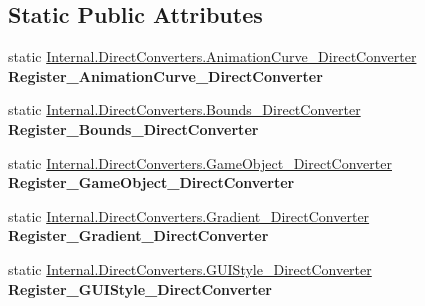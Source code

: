 \subsection*{Static Public Attributes}
\begin{DoxyCompactItemize}
\item 
\mbox{\label{class_full_serializer_1_1fs_converter_registrar_a5a1deb9741810cdec343a6ce0efb73a3}} 
static \hyperlink{class_full_serializer_1_1_internal_1_1_direct_converters_1_1_animation_curve___direct_converter}{Internal.\+Direct\+Converters.\+Animation\+Curve\+\_\+\+Direct\+Converter} {\bfseries Register\+\_\+\+Animation\+Curve\+\_\+\+Direct\+Converter}
\item 
\mbox{\label{class_full_serializer_1_1fs_converter_registrar_a2a349214c9fa67680eb9f59a02c2c0a8}} 
static \hyperlink{class_full_serializer_1_1_internal_1_1_direct_converters_1_1_bounds___direct_converter}{Internal.\+Direct\+Converters.\+Bounds\+\_\+\+Direct\+Converter} {\bfseries Register\+\_\+\+Bounds\+\_\+\+Direct\+Converter}
\item 
\mbox{\label{class_full_serializer_1_1fs_converter_registrar_a80be0ea4830b55c0515daed222760c9d}} 
static \hyperlink{class_full_serializer_1_1_internal_1_1_direct_converters_1_1_game_object___direct_converter}{Internal.\+Direct\+Converters.\+Game\+Object\+\_\+\+Direct\+Converter} {\bfseries Register\+\_\+\+Game\+Object\+\_\+\+Direct\+Converter}
\item 
\mbox{\label{class_full_serializer_1_1fs_converter_registrar_afc9cb33054876efd305dc172af2ee085}} 
static \hyperlink{class_full_serializer_1_1_internal_1_1_direct_converters_1_1_gradient___direct_converter}{Internal.\+Direct\+Converters.\+Gradient\+\_\+\+Direct\+Converter} {\bfseries Register\+\_\+\+Gradient\+\_\+\+Direct\+Converter}
\item 
\mbox{\label{class_full_serializer_1_1fs_converter_registrar_afa11e5e658aeec293b54117312b82bc6}} 
static \hyperlink{class_full_serializer_1_1_internal_1_1_direct_converters_1_1_g_u_i_style___direct_converter}{Internal.\+Direct\+Converters.\+G\+U\+I\+Style\+\_\+\+Direct\+Converter} {\bfseries Register\+\_\+\+G\+U\+I\+Style\+\_\+\+Direct\+Converter}

\end{DoxyCompactItemize}
